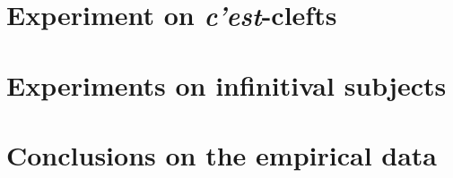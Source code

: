 \chapter{Experiment on \emph{c'est}-clefts}


\chapter{Experiments on infinitival subjects}




\chapter{Conclusions on the empirical data}

